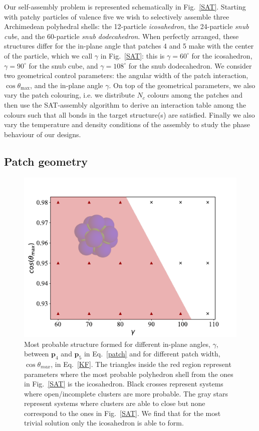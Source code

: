 \documentclass[a4paper, amsfonts, amssymb, amsmath, reprint, showkeys, nofootinbib, oneside]{revtex4-1}
\begin{document}
Our self-assembly problem is represented schematically in Fig.~\ref{SAT}. Starting with patchy particles of valence five we wish to selectively assemble three Archimedean polyhedral shells: the 12-particle \emph{icosahedron}, the 24-particle \emph{snub cube}, and the 60-particle \emph{snub dodecahedron}. When perfectly arranged, these structures differ for the in-plane angle that patches 4 and 5 make with the center of the particle, which we call $\gamma$ in Fig.~\ref{SAT}: this is $\gamma=60^\circ$ for the icosahedron, $\gamma=90^\circ$ for the snub cube, and  $\gamma=108^\circ$ for the snub dodecahedron. We consider two geometrical control parameters: the angular width of the patch interaction, $\cos\theta_\text{max}$, and the in-plane angle $\gamma$. On top of the geometrical parameters, we also vary the patch colouring, i.e. we distribute $N_c$ colours among the patches and then use the SAT-assembly algorithm to derive an interaction table among the colours such that all bonds in the target structure(s) are satisfied. Finally we also vary the temperature and density conditions of the assembly to study the phase behaviour of our designs.


\subsection{Patch geometry}


\begin{figure}[t]
	\includegraphics{fig2.pdf}
	\caption{\label{N1c1} Most probable structure formed for different in-plane angles, $\gamma$, between $\textbf{p}_4$ and $\textbf{p}_5$ in Eq.~\ref{patch} and for different patch width, $\cos\theta_{max}$, in Eq.~\ref{KF}. The triangles inside the red region represent parameters where the most probable polyhedron shell from the ones in Fig.~\ref{SAT} is the icosahedron. Black crosses represent systems where open/incomplete clusters are more probable. The gray stars represent systems where clusters are able to close but none correspond to the ones in Fig.~\ref{SAT}. We find that for the most trivial solution only the icosahedron is able to form.}
\end{figure}
\end{document}
